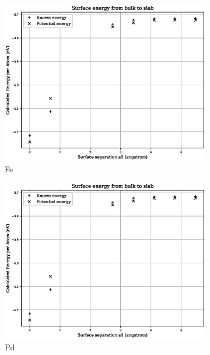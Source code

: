 \begin{figure}[htb]
\begin{subfigure}{.48\textwidth}
  \centering
  \includegraphics[width=.94\linewidth]{chapters/potentials_fe_pd_ru/fepd_potential/fe_surface_energy.eps} 
  \caption{Fe}
  \label{fig:fepd-fe-surface}
\end{subfigure}
\begin{subfigure}{.48\textwidth}
  \centering
  \includegraphics[width=.94\linewidth]{chapters/potentials_fe_pd_ru/fepd_potential/pd_surface_energy.eps} 
  \caption{Pd}
  \label{fig:fepd-pd-surface}
\end{subfigure}
\begin{subfigure}{.48\textwidth}
  \centering

\end{subfigure}
\end{figure}
